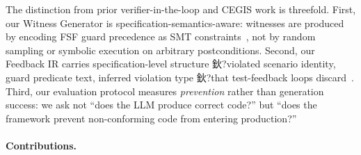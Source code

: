 The distinction from prior verifier-in-the-loop and CEGIS work is threefold.
First, our Witness Generator is specification-semantics-aware: witnesses are produced by
encoding FSF guard precedence as SMT constraints~\cite{demoura2008z3}, not by random
sampling or symbolic execution on arbitrary postconditions.
Second, our Feedback IR carries specification-level structure 鈥?violated scenario identity,
guard predicate text, inferred violation type 鈥?that test-feedback loops
discard~\cite{sun2024clover}.
Third, our evaluation protocol measures \emph{prevention} rather than generation success:
we ask not ``does the LLM produce correct code?'' but ``does the framework prevent
non-conforming code from entering production?''

\paragraph{Contributions.}
